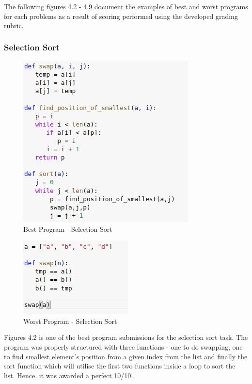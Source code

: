 The following figures 4.2 - 4.9 document the examples of best and worst programs for each problems as a result of scoring performed using the developed grading rubric. 

\subsubsection{Selection Sort}

\begin{figure}[h]
\centering
\includegraphics[]{./figures/best_ss.png}
\caption{Best Program - Selection Sort}
\label{fig1}
\end{figure}

\begin{figure}[H]
\centering
\includegraphics[scale=1.2]{./figures/ss_worst.png}
\caption{Worst Program - Selection Sort}
\label{fig1}
\end{figure}


Figures 4.2 is one of the best program submissions for the selection sort task. The program was properly structured with three functions - one to do swapping, one to find smallest element's position from a given index from the list and finally the sort function which will utilise the first two functions inside a loop to sort the list. Hence, it was awarded a perfect 10/10.

